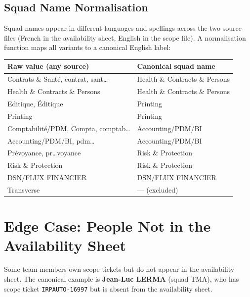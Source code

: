 \documentclass[12pt, a4paper]{article}
\begin{document}
\subsection{Squad Name Normalisation}

Squad names appear in different languages and spellings across the two source files
(French in the availability sheet, English in the scope file). A normalisation function
maps all variants to a canonical English label:

\begin{center}
\begin{tabular}{ll}
    \toprule
    \textbf{Raw value (any source)} & \textbf{Canonical squad name} \\
    \midrule
    Contrats \& Santé, contrat, sant\ldots    & Health \& Contracts \& Persons \\
    Health \& Contracts \& Persons            & Health \& Contracts \& Persons \\
    Editique, Éditique                        & Printing \\
    Printing                                  & Printing \\
    Comptabilité/PDM, Compta, comptab\ldots   & Accounting/PDM/BI \\
    Accounting/PDM/BI, pdm\ldots              & Accounting/PDM/BI \\
    Prévoyance, pr\ldots voyance              & Risk \& Protection \\
    Risk \& Protection                        & Risk \& Protection \\
    DSN/FLUX FINANCIER                        & DSN/FLUX FINANCIER \\
    Transverse                                & — (excluded) \\
    \bottomrule
\end{tabular}
\end{center}

\section{Edge Case: People Not in the Availability Sheet}

Some team members own scope tickets but do not appear in the availability sheet. The
canonical example is \textbf{Jean-Luc LERMA} (squad TMA), who has scope ticket
\texttt{IRPAUTO-16997} but is absent from the availability sheet.
\end{document}
